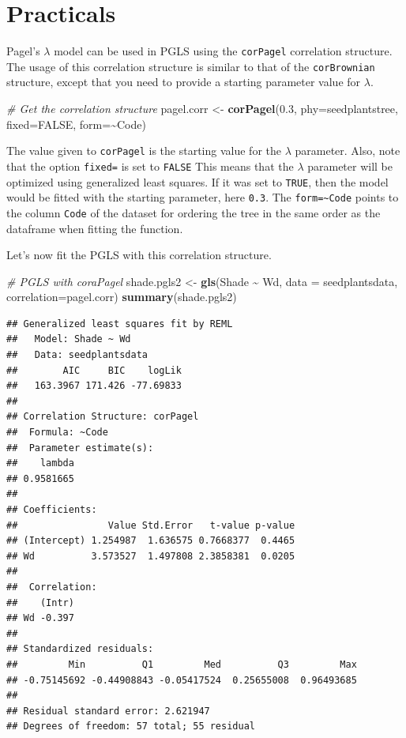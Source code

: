 \documentclass[
]{book}
\newenvironment{Shaded}{\begin{snugshade}}{\end{snugshade}}
\newcommand{\AttributeTok}[1]{\textcolor[rgb]{0.13,0.29,0.53}{#1}}
\newcommand{\CommentTok}[1]{\textcolor[rgb]{0.56,0.35,0.01}{\textit{#1}}}
\newcommand{\ConstantTok}[1]{\textcolor[rgb]{0.56,0.35,0.01}{#1}}
\newcommand{\FloatTok}[1]{\textcolor[rgb]{0.00,0.00,0.81}{#1}}
\newcommand{\FunctionTok}[1]{\textcolor[rgb]{0.13,0.29,0.53}{\textbf{#1}}}
\newcommand{\NormalTok}[1]{#1}
\newcommand{\OtherTok}[1]{\textcolor[rgb]{0.56,0.35,0.01}{#1}}
\newcommand{\SpecialCharTok}[1]{\textcolor[rgb]{0.81,0.36,0.00}{\textbf{#1}}}
\begin{document}
\section{Practicals}\label{practicals-1}

Pagel's \(\lambda\) model can be used in PGLS using the \texttt{corPagel} correlation structure. The usage of this correlation structure is similar to that of the \texttt{corBrownian} structure, except that you need to provide a starting parameter value for \(\lambda\).

\begin{Shaded}
\begin{Highlighting}[]
\CommentTok{\# Get the correlation structure}
\NormalTok{pagel.corr }\OtherTok{\textless{}{-}} \FunctionTok{corPagel}\NormalTok{(}\FloatTok{0.3}\NormalTok{, }\AttributeTok{phy=}\NormalTok{seedplantstree, }\AttributeTok{fixed=}\ConstantTok{FALSE}\NormalTok{, }\AttributeTok{form=}\SpecialCharTok{\textasciitilde{}}\NormalTok{Code)}
\end{Highlighting}
\end{Shaded}

The value given to \texttt{corPagel} is the starting value for the \(\lambda\) parameter. Also, note that the option \texttt{fixed=} is set to \texttt{FALSE} This means that the \(\lambda\) parameter will be optimized using generalized least squares. If it was set to \texttt{TRUE}, then the model would be fitted with the starting parameter, here \texttt{0.3}. The \texttt{form=\textasciitilde{}Code} points to the column \texttt{Code} of the dataset for ordering the tree in the same order as the dataframe when fitting the function.

Let's now fit the PGLS with this correlation structure.

\begin{Shaded}
\begin{Highlighting}[]
\CommentTok{\# PGLS with coraPagel}
\NormalTok{shade.pgls2 }\OtherTok{\textless{}{-}} \FunctionTok{gls}\NormalTok{(Shade }\SpecialCharTok{\textasciitilde{}}\NormalTok{ Wd, }\AttributeTok{data =}\NormalTok{ seedplantsdata, }\AttributeTok{correlation=}\NormalTok{pagel.corr)}
\FunctionTok{summary}\NormalTok{(shade.pgls2)}
\end{Highlighting}
\end{Shaded}

\begin{verbatim}
## Generalized least squares fit by REML
##   Model: Shade ~ Wd 
##   Data: seedplantsdata 
##        AIC     BIC    logLik
##   163.3967 171.426 -77.69833
## 
## Correlation Structure: corPagel
##  Formula: ~Code 
##  Parameter estimate(s):
##    lambda 
## 0.9581665 
## 
## Coefficients:
##                Value Std.Error   t-value p-value
## (Intercept) 1.254987  1.636575 0.7668377  0.4465
## Wd          3.573527  1.497808 2.3858381  0.0205
## 
##  Correlation: 
##    (Intr)
## Wd -0.397
## 
## Standardized residuals:
##         Min          Q1         Med          Q3         Max 
## -0.75145692 -0.44908843 -0.05417524  0.25655008  0.96493685 
## 
## Residual standard error: 2.621947 
## Degrees of freedom: 57 total; 55 residual
\end{verbatim}
\end{document}
